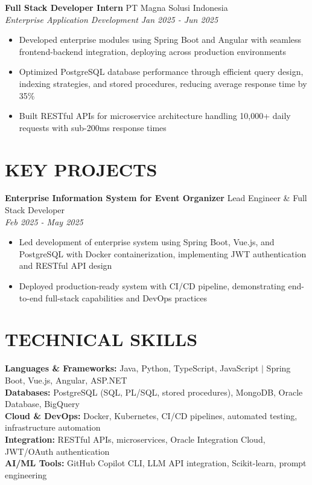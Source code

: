 \documentclass[10pt,a4paper]{article}
\newcommand{\experienceheader}[4]{
    \textbf{#1} \hfill #2 \\
    \textit{#3} \hfill \textit{#4}
}
\begin{document}
\experienceheader{Full Stack Developer Intern}{PT Magna Solusi Indonesia}{Enterprise Application Development}{Jan 2025 - Jun 2025}
\begin{itemize}[leftmargin=*, itemsep=1pt, topsep=1pt]
    \item Developed enterprise modules using Spring Boot and Angular with seamless frontend-backend integration, deploying across production environments
    \item Optimized PostgreSQL database performance through efficient query design, indexing strategies, and stored procedures, reducing average response time by 35\%
    \item Built RESTful APIs for microservice architecture handling 10,000+ daily requests with sub-200ms response times
\end{itemize}

\section*{KEY PROJECTS}

\experienceheader{Enterprise Information System for Event Organizer}{Lead Engineer \& Full Stack Developer}{}{Feb 2025 - May 2025}
\begin{itemize}[leftmargin=*, itemsep=1pt, topsep=1pt]
    \item Led development of enterprise system using Spring Boot, Vue.js, and PostgreSQL with Docker containerization, implementing JWT authentication and RESTful API design
    \item Deployed production-ready system with CI/CD pipeline, demonstrating end-to-end full-stack capabilities and DevOps practices
\end{itemize}

\section*{TECHNICAL SKILLS}

\textbf{Languages \& Frameworks:} Java, Python, TypeScript, JavaScript $|$ Spring Boot, Vue.js, Angular, ASP.NET \\
\textbf{Databases:} PostgreSQL (SQL, PL/SQL, stored procedures), MongoDB, Oracle Database, BigQuery \\
\textbf{Cloud \& DevOps:} Docker, Kubernetes, CI/CD pipelines, automated testing, infrastructure automation \\
\textbf{Integration:} RESTful APIs, microservices, Oracle Integration Cloud, JWT/OAuth authentication \\
\textbf{AI/ML Tools:} GitHub Copilot CLI, LLM API integration, Scikit-learn, prompt engineering
\end{document}
